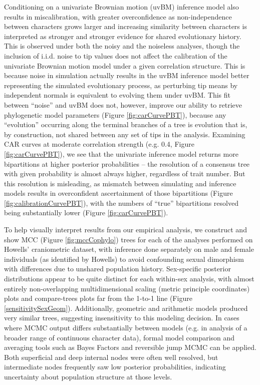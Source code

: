 \documentclass[10pt, twocolumn, twoside]{article}
\begin{document}
Conditioning on a univariate Brownian motion (uvBM) inference model also results in miscalibration, with greater overconfidence as non-independence between characters grows larger and increasing similarity between characters is interpreted as stronger and stronger evidence for shared evolutionary history. This is observed under both the noisy and the noiseless analyses, though the inclusion of i.i.d. noise to tip values does not affect the calibration of the univariate Brownian motion model under a given correlation structure. This is because noise in simulation actually results in the uvBM inference model better representing the simulated evolutionary process, as perturbing tip means by independent normals is equivalent to evolving them under uvBM. This fit between “noise” and uvBM does not, however, improve our ability to retrieve phylogenetic model parameters (Figure \ref{fig:carCurvePBT}), because any “evolution” occurring along the terminal branches of a tree is evolution that is, by construction, not shared between any set of tips in the analysis. Examining CAR curves at moderate correlation strength (e.g. 0.4, Figure \ref{fig:carCurvePBT}), we see that the univariate inference model returns more bipartitions at higher posterior probabilities – the resolution of a consensus tree with given probability is almost always higher, regardless of trait number. But this resolution is misleading, as mismatch between simulating and inference models results in overconfident ascertainment of those bipartitions (Figure \ref{fig:calibrationCurvePBT}), with the numbers of “true” bipartitions resolved being substantially lower (Figure \ref{fig:carCurvePBT}).

To help visually interpret results from our empirical analysis, we construct and show MCC (Figure \ref{fig:mccCophylo}) trees for each of the analyses performed on Howells’ craniometric dataset, with inference done separately on male and female individuals (as identified by Howells) to avoid confounding sexual dimorphism with differences due to unshared population history. Sex-specific posterior distributions appear to be quite distinct for each within-sex analysis, with almost entirely non-overlapping multidimensional scaling (metric principle coordinates) plots and compare-trees plots far from the 1-to-1 line (Figure \ref{sensitivitySexGeom}). Additionally, geometric and arithmetic models produced very similar trees, suggesting insensitivity to this modeling decision. In cases where MCMC output differs substantially between models (e.g. in analysis of a broader range of continuous character data), formal model comparison and averaging tools such as Bayes Factors and reversible jump MCMC can be applied. Both superficial and deep internal nodes were often well resolved, but intermediate nodes frequently saw low posterior probabilities, indicating uncertainty about population structure at those levels. 
\end{document}
